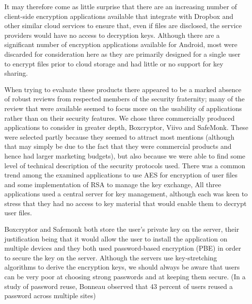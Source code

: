 It may therefore come as little surprise that there are an increasing  number of client-side encryption applications available that  integrate with Dropbox and other similar cloud services  to ensure that, even if files are disclosed, the service providers would have no access to decryption keys.
Although there are a significant number of encryption applications available for Android, most were discarded for consideration here as they are primarily designed for a single user to encrypt files prior to cloud storage and had little or no support for key sharing.  

When trying to evaluate these products there appeared to be a marked absence of robust reviews from respected members of the security fraternity; many of the review that were available seemed to focus more on the usability of applications rather than on their security features.  We chose three commercially produced applications to consider in greater depth, Boxcryptor, Viivo and SafeMonk.  These were selected partly because they seemed to attract most mentions (although that may simply be due to the fact that they were commercial products and hence had larger marketing budgets), but also because we were able to find some level of technical description of the security protocols used.  There was a common trend among the examined applications to use AES for encryption of user files and some implementation of RSA to manage the key exchange, All three applications used a central server  for key management, although each was keen to stress that they had no access to key material that would enable them to decrypt user files. 

Boxcryptor and Safemonk both store the user's private key on the server, their justification being that it would allow the user to install the application on multiple devices and they both used password-based encryption (PBE) in order to secure the key on the server.  Although the servers use key-stretching algorithms to derive the encryption keys, we should always be aware that users can be very poor at choosing strong passwords and at keeping them secure. (In a study of password reuse, Bonneau \cite{das2014tangled} observed that 43 percent of  users reused a password across multiple sites)




